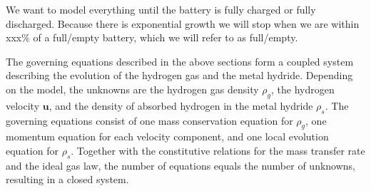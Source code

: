 We want to model everything until the battery is fully charged or fully discharged. Because there is exponential growth we will stop when we are within xxx\% of a full/empty battery, which we will refer to as full/empty.

The governing equations described in the above sections form a coupled system describing the evolution of the hydrogen gas and the metal hydride. Depending on the model, the unknowns are the hydrogen gas density $\rho_g$, the hydrogen velocity $\mathbf{u}$, and the density of absorbed hydrogen in the metal hydride $\rho_s$. The governing equations consist of one mass conservation equation for $\rho_g$, one momentum equation for each velocity component, and one local evolution equation for $\rho_s$. Together with the constitutive relations for the mass transfer rate and the ideal gas law, the number of equations equals the number of unknowns, resulting in a closed system.

